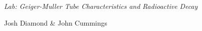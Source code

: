 {\LARGE {\em \noindent Lab: Geiger-Muller Tube Characteristics and Radioactive
Decay}} 

\large{\noindent Josh Diamond \& John Cummings}
